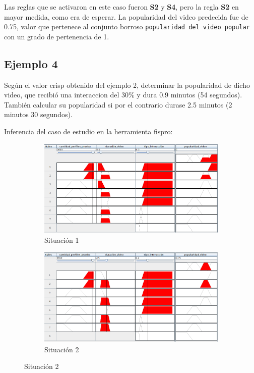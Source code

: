 \documentclass{article}
\begin{document}
Las reglas que se activaron en este caso fueron \textbf{S2} y \textbf{S4}, pero la regla \textbf{S2} en mayor medida, como era de esperar. La popularidad del video predecida fue de 0.75, valor que pertenece al conjunto borroso \verb|popularidad del video popular| con un grado de pertenencia de 1.

\subsection*{Ejemplo 4}

Según el valor crisp obtenido del ejemplo 2, determinar la popularidad de dicho video, que recibió una interaccion del $30\%$ y dura 0.9 minutos (54 segundos). También calcular su popularidad si por el contrario durase 2.5 minutos (2 minutos 30 segundos).

Inferencia del caso de estudio en la herramienta fispro:
\begin{figure}[H]
\begin{subfigure}[b]{0.3\textwidth}
	\centering
	\includegraphics*[scale=0.32]{./Images/p4-1.png}
	\caption{Situación 1}
\end{subfigure}

\begin{subfigure}[b]{0.3\textwidth}
	\centering
	\includegraphics*[scale=0.32]{./Images/p4-2.png}
	\caption{Situación 2}
\end{subfigure}
\end{figure}
\end{document}
